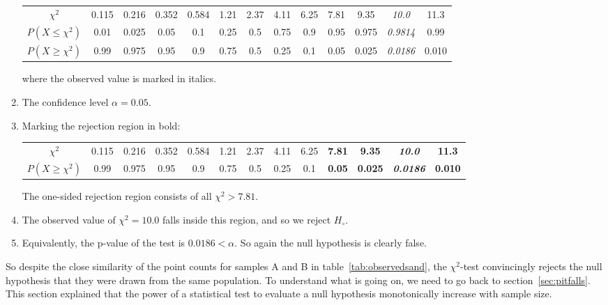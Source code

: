 \begin{enumerate}
  \begin{center}
    \begin{tabular}{c|c@{\gap}c@{\gap}c@{\gap}c@{\gap}
        c@{\gap}c@{\gap}c@{\gap}c@{\gap}c@{\gap}c@{\gap}c@{\gap}c}
      $\chi^2$ & 0.115 & 0.216 & 0.352 & 0.584 & 1.21 & 2.37 &
      4.11 & 6.25 & 7.81 & 9.35 & \emph{10.0} & 11.3 \\
      $P(X\leq{\chi^2})$ & 0.01 & 0.025 & 0.05 & 0.1 & 0.25 &
      0.5 & 0.75 & 0.9 & 0.95 & 0.975 & \emph{0.9814} & 0.99 \\
      $P(X\geq{\chi^2})$ & 0.99 & 0.975 & 0.95 & 0.9 & 0.75 & 0.5 &
      0.25 & 0.1 & 0.05 & 0.025 & \emph{0.0186} & 0.010
    \end{tabular}
  \end{center}

  \noindent where the observed value is marked in italics.
  
\item The confidence level $\alpha = 0.05$.

\item Marking the rejection region in bold:
  
  \begin{center}
    \begin{tabular}{c|c@{\gap}c@{\gap}c@{\gap}c@{\gap}
        c@{\gap}c@{\gap}c@{\gap}c@{\gap}c@{\gap}c@{\gap}c@{\gap}c}
      $\chi^2$ & 0.115 & 0.216 & 0.352 & 0.584 & 1.21 & 2.37 &
      4.11 & 6.25 & \textbf{7.81} & \textbf{9.35} &
      \textbf{\emph{10.0}} & \textbf{11.3} \\
      $P(X\geq{\chi^2})$ & 0.99 & 0.975 & 0.95 & 0.9 & 0.75 & 0.5 &
      0.25 & 0.1 & \textbf{0.05} & \textbf{0.025} &
      \textbf{\emph{0.0186}} & \textbf{0.010}
    \end{tabular}
  \end{center}

  The one-sided rejection region consists of all $\chi^2>{7.81}$.

\item The observed value of $\chi^2=10.0$ falls inside this region,
  and so we reject $H_\circ$.

\item Equivalently, the p-value of the test is $0.0186<\alpha$.  So
  again the null hypothesis is clearly false.
  
\end{enumerate}

So despite the close similarity of the point counts for samples A and
B in table~\ref{tab:observedsand}, the $\chi^2$-test convincingly
rejects the null hypothesis that they were drawn from the same
population. To understand what is going on, we need to go back to
section~\ref{sec:pitfalls}. This section explained that the power of a
statistical test to evaluate a null hypothesis monotonically increase
with sample size.\\

